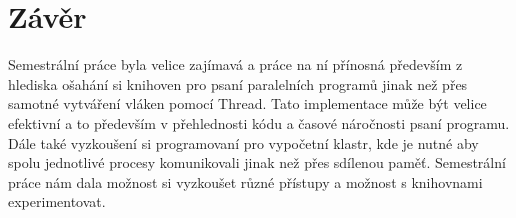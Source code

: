 \documentclass[]{article}
\begin{document}
\section{Závěr}

Semestrální práce byla velice zajímavá a práce na ní přínosná především z hlediska ošahání si knihoven pro psaní paralelních programů jinak než přes samotné vytváření vláken pomocí Thread. Tato implementace může být velice efektivní a to především v přehlednosti kódu a časové náročnosti psaní programu. Dále také vyzkoušení si programovaní pro vypočetní klastr, kde je nutné aby spolu jednotlivé procesy komunikovali jinak než přes sdílenou paměť. Semestrální práce nám dala možnost si vyzkoušet různé přístupy a možnost s knihovnami experimentovat.
\end{document}
